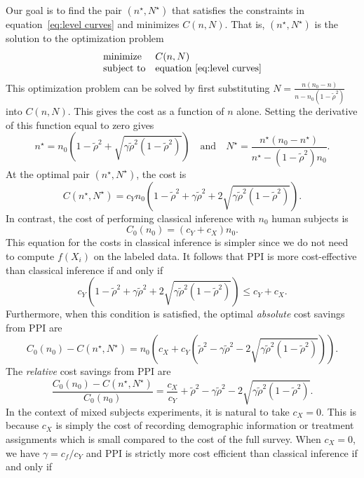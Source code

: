 Our goal is to find the pair $(n^\star, N^\star)$ that satisfies the constraints in equation~\eqref{eq:level curves} and minimizes $C(n,N)$. That is, $(n^\star, N^\star)$ is the solution to the optimization problem
\begin{equation}
\begin{array}{ll}
        \mbox{minimize} & C(n,N)\\
        \mbox{subject to} & \mbox{equation }\eqref{eq:level curves}
    \end{array}
\end{equation}
This optimization problem can be solved by first substituting $N=\frac{n(n_0-n)}{n-n_0(1-\tilde{\rho}^2)}$ into $C(n,N)$. This gives the cost as a function of $n$ alone. Setting the derivative of this function equal to zero gives
\begin{equation}\label{eq:nstar}
    n^\star = n_0\left(1-\tilde{\rho}^2+\sqrt{\gamma \tilde{\rho}^2(1-\tilde{\rho}^2)}\right)\quad \text{and} \quad N^\star =   \frac{n^\star(n_0-n^\star)}{n^\star - (1-\tilde{\rho}^2)n_0}.
\end{equation}
At the optimal pair $(n^\star, N^\star)$, the cost is 
\begin{equation}\label{eq:best-cost}
    C(n^\star, N^\star) = c_Y n_0\left(1-\tilde{\rho}^2 + \gamma\tilde{\rho}^2 +2\sqrt{\gamma \tilde{\rho}^2(1-\tilde{\rho}^2)} \right). 
\end{equation}
In contrast, the cost of performing classical inference with $n_0$ human subjects is 
\[
    C_0(n_0) = (c_Y+c_X)n_0. 
\]
This equation for the costs in classical inference is simpler since we do not need to compute $f(X_i)$ on the labeled data. It follows that PPI is more cost-effective than classical inference if and only if 
\[
c_Y \left(1-\tilde{\rho}^2 + \gamma\tilde{\rho}^2 +2\sqrt{\gamma \tilde{\rho}^2(1-\tilde{\rho}^2)} \right) \le c_Y+c_X.
\]
Furthermore, when this condition is satisfied, the optimal \emph{absolute} cost savings from PPI are
\[
C_0(n_0) - C(n^\star, N^\star) = n_0(c_X + c_Y(\tilde{\rho}^2 - \gamma \tilde{\rho}^2 - 2 \sqrt{\gamma \tilde{\rho}^2 (1-\tilde{\rho}^2)})).
\]
The \emph{relative} cost savings from PPI are 
\[
\frac{C_0(n_0)-C(n^\star, N^\star)}{C_0(n_0)} = \frac{c_X}{c_Y} + \tilde{\rho}^2 - \gamma \tilde{\rho}^2 - 2 \sqrt{\gamma \tilde{\rho}^2(1-\tilde{\rho}^2)}.
\]
In the context of mixed subjects experiments, it is natural to take $c_X=0$. This is because $c_X$ is simply the cost of recording demographic information or treatment assignments which is small compared to the cost of the full survey. When $c_X=0$, we have $\gamma = c_f/c_Y$ and PPI is strictly more cost efficient than classical inference if and only if 
